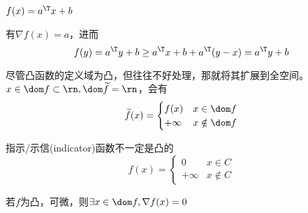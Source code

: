 \documentclass{note}
\begin{document}
\begin{example}
$f(x)=a^\T x+b$
\end{example}
\begin{analysis}
有$\nabla f(x)=a$，进而
\[f(y)=a^\T y+b\geq a^\T x+b+a^\T(y-x)=a^\T y+b\]
\end{analysis}

\begin{definition}
尽管凸函数的定义域为凸，但往往不好处理，那就将其扩展到全空间。
$x\in\dom f\subset\rn, \dom\widetilde{f}=\rn$，会有
\[\widetilde{f}(x)=\begin{cases}f(x)&x\in\dom f\\+\infty&x\notin\dom f\end{cases}\]
\end{definition}

指示/示信(indicator)函数不一定是凸的
\[f(x)=\begin{cases}0&x\in C\\ +\infty & x\notin C\end{cases}\]

\begin{theorem}
若$f$为凸，可微，则$\exists x\in\dom f,\nabla f(x)=0$
\end{theorem}
\end{document}
